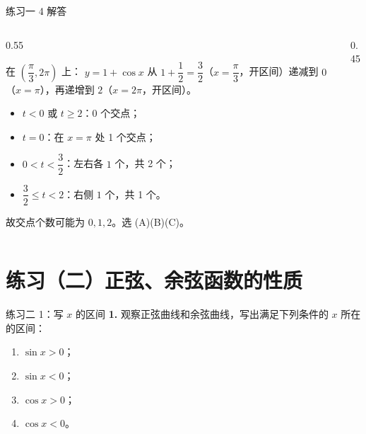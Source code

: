 \documentclass[10pt,aspectratio=169,serif]{beamer}
\begin{document}
\begin{frame}[t]{练习一 4 解答}
\begin{columns}
\begin{column}{0.55\textwidth}
\begin{tcolorbox}[colback=orange!10,colframe=orange,title=\textbf{解}]
在 $\left(\dfrac{\pi}{3},2\pi\right)$ 上：
$y=1+\cos x$ 从 $1+\dfrac12=\dfrac32$（$x=\dfrac\pi3$，开区间）递减到 $0$（$x=\pi$），再递增到 $2$（$x=2\pi$，开区间）。
\vspace{0.3em}
\begin{itemize}
  \item $t<0$ 或 $t\ge 2$：\alert{0 个}交点；
  \item $t=0$：在 $x=\pi$ 处 \alert{1 个}交点；
  \item $0<t<\dfrac32$：左右各 $1$ 个，共 \alert{2 个}；
  \item $\dfrac32\le t<2$：右侧 $1$ 个，共 \alert{1 个}。
\end{itemize}
故交点个数可能为 $0,1,2$。选 \alert{(A)(B)(C)}。
\end{tcolorbox}
\end{column}
\begin{column}{0.45\textwidth}
\end{column}
\end{columns}
\end{frame}

\section*{练习（二）正弦、余弦函数的性质}

\begin{frame}[t]{练习二 1：写 $x$ 的区间}
\textbf{1.} 观察正弦曲线和余弦曲线，写出满足下列条件的 $x$ 所在的区间：
\begin{enumerate}[(1)]
  \item $\sin x>0$； \qquad
  \item $\sin x<0$； \qquad
  \item $\cos x>0$； \qquad
  \item $\cos x<0$。
\end{enumerate}
\end{frame}
\end{document}
